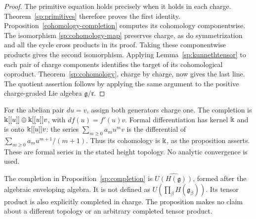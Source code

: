 \begin{proof}
The primitive equation holds precisely when it holds in each charge.
Theorem~\ref{sp:primitives} therefore proves the first identity.
Proposition~\ref{cohomology-completion} computes its cohomology
componentwise.
The isomorphism \eqref{sp:cohomology-map} preserves charge, as do
symmetrization and all the cycle cross products in its proof.
Taking these componentwise products gives the second isomorphism.
Applying Lemma~\ref{sp:kunnethtensor} to each pair of charge
components identifies the target of its cohomological coproduct.
Theorem~\ref{sp:cohomology}, charge by charge, now gives the last line.
The quotient assertion follows by applying the same argument to the
positive charge-graded Lie algebra $\mathfrak g/\mathfrak r$.
\end{proof}

For the abelian pair $du=v$, assign both generators charge one.
The completion is $\Bbbk[[u]]\oplus \Bbbk[[u]]v$, with $d f(u)=f'(u)v$.
Formal differentiation has kernel $\Bbbk$ and is onto $\Bbbk[[u]]v$:
the series $\sum_{m\geq0}a_mu^mv$ is the differential of
$\sum_{m\geq0}a_mu^{m+1}/(m+1)$.
Thus its cohomology is $\Bbbk$, as the proposition asserts.
These are formal series in the stated height topology.
No analytic convergence is used.

The completion in Proposition~\ref{sp:completion} is
$\widehat{U(H(\mathfrak g))}$, formed after the algebraic enveloping
algebra.  It is not defined as $U(\prod_\beta H(\mathfrak g_\beta))$.
Its tensor product is also explicitly completed in charge.
The proposition makes no claim about a different topology or an
arbitrary completed tensor product.

